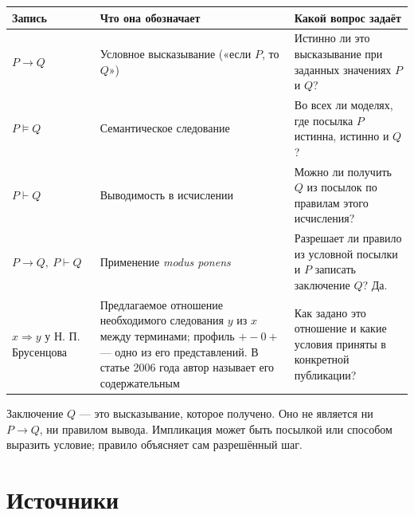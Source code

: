 \documentclass[12pt,a4paper]{article}
\begin{document}
\begin{longtable}{P{.18\linewidth}P{.43\linewidth}P{.27\linewidth}}
\toprule
\textbf{Запись} & \textbf{Что она обозначает} & \textbf{Какой вопрос задаёт} \\
\midrule
\(P\to Q\) & Условное высказывание («если \(P\), то \(Q\)») & Истинно ли это высказывание при заданных значениях \(P\) и \(Q\)? \\
\(P\models Q\) & Семантическое следование & Во всех ли моделях, где посылка \(P\) истинна, истинно и \(Q\)? \\
\(P\vdash Q\) & Выводимость в исчислении & Можно ли получить \(Q\) из посылок по правилам этого исчисления? \\
\(P\to Q,\ P\vdash Q\) & Применение \emph{modus ponens} & Разрешает ли правило из условной посылки и \(P\) записать заключение \(Q\)? Да. \\
\(x\Rightarrow y\) у Н. П. Брусенцова & Предлагаемое отношение необходимого следования \(y\) из \(x\) между терминами; профиль \(+-0+\) — одно из его представлений. В статье 2006 года автор называет его содержательным & Как задано это отношение и какие условия приняты в конкретной публикации? \\
\bottomrule
\end{longtable}

Заключение \(Q\) — это высказывание, которое получено. Оно не является ни \(P\to Q\), ни правилом вывода. Импликация может быть посылкой или способом выразить условие; правило объясняет сам разрешённый шаг.

\newpage
\section{Источники}
\end{document}
